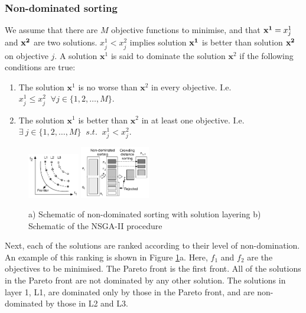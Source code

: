 \documentclass[sigconf]{acmart}
\begin{document}
\subsubsection{Non-dominated sorting}
We assume that there are $M$ objective functions to minimise, and that ${\bf x^{1}} = x_j^{1}$ and $\bf x^{2}$ are two solutions. $x_j^{1}<x_j^{2}$ implies solution $\bf x^{1}$ is better than solution $\bf x^{2}$ on objective $j$. A solution $\mathbf{x}^{1}$ is said to dominate the solution $\mathbf{x}^{2}$ if the following conditions are true:
\begin{enumerate}
  \item The solution $\mathbf{x}^{1}$ is no worse than $\mathbf{x}^{2}$ in every objective. I.e. $x^{1}_j \leq x^{2}_j \;\;  \forall j \in\{1,2,\ldots,M\}$.
  \item The solution $\mathbf{x}^{1}$ is better than $\mathbf{x}^{2}$ in at least one objective. I.e. $\exists\  {j}\in \{ 1,2,\ldots,M\} \;\; s.t. \;\;x^{1}_j < x^{2}_j$.
\end{enumerate}



\begin{figure}[t] 
  \vskip -10pt
  \center
  \includegraphics[width=0.2\textwidth]{figures/carbon_optimiser/paretofrontier/paretofrontier}
  \includegraphics[width=0.270\textwidth]{figures/carbon_optimiser/algsketch/sketch2}
  \vskip -8pt
  \caption{a) Schematic of non-dominated sorting with solution layering b) Schematic of the NSGA-II procedure}
  \label{fig:pareto-layering}
  \vskip -15pt
\end{figure}


Next, each of the solutions are ranked according to their level of non-domination. An example of this ranking is shown in Figure \ref{fig:pareto-layering}a. Here, $f_1$ and $f_2$ are the objectives to be minimised. The Pareto front is the first front. All of the solutions in the Pareto front are not dominated by any other solution. The solutions in layer 1, L1, are dominated only by those in the Pareto front, and are non-dominated by those in L2 and L3.
\end{document}
